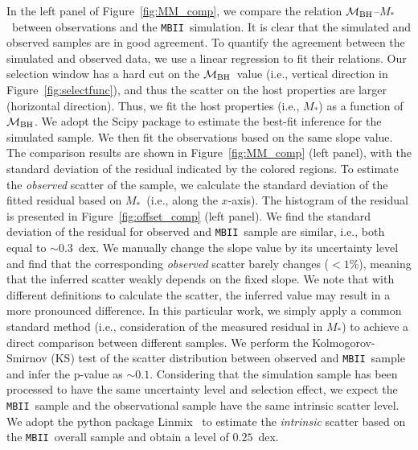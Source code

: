 \documentclass[twocolumn,trackchanges]{aastex63}
\newcommand{\mbh}{$\mathcal M_{\rm BH}$}
\newcommand{\mstar}{{$M_*$}}
\newcommand{\mbii}{\texttt{MBII}}
\begin{document}
In the left panel of Figure~\ref{fig:MM_comp}, we compare the relation \mbh--\mstar~between observations and the \mbii\ simulation. It is clear that the simulated and observed samples are in good agreement. 
To quantify the agreement between the simulated and observed data, we use a linear regression to fit their relations. Our selection window has a hard cut on the \mbh\ value (i.e., vertical direction in Figure~\ref{fig:selectfunc}), and thus the scatter on the host properties are larger (horizontal direction). Thus, we fit the host properties (i.e., \mstar) as a function of \mbh. We adopt the {\sc Scipy} package to estimate the best-fit inference for the simulated sample. We then fit the observations based on the same slope value. The comparison results are shown in Figure~\ref{fig:MM_comp} (left panel), with the standard deviation of the residual indicated by the colored regions.
To estimate the {\it observed} scatter of the sample, we calculate the standard deviation of the fitted residual based on \mstar\ (i.e., along the $x$-axis). The histogram of the residual is presented in Figure~\ref{fig:offset_comp} (left panel). We find the standard deviation of the residual for observed and \mbii\ sample are similar, i.e., both equal to $\sim0.3$~dex. We manually change the slope value by its uncertainty level and find that the corresponding {\it observed} scatter barely changes ($<1\%$), meaning that the inferred scatter weakly depends on the fixed slope. We note that with different definitions to calculate the scatter, the inferred value may result in a more pronounced difference. In this particular work, we simply apply a common standard method (i.e., consideration of the measured residual in \mstar) to achieve a direct comparison between different samples. We perform the Kolmogorov-Smirnov (KS) test of the scatter distribution between observed and \mbii\ sample and infer the p-value as $\sim0.1$. Considering that the simulation sample has been processed to have the same uncertainty level and selection effect, we expect the \mbii\ sample and the observational sample have the same intrinsic scatter level. We adopt the python package {\sc Linmix}~\citep{Kelly2007} to estimate the {\it intrinsic} scatter based on the \mbii\ overall sample and obtain a level of $0.25$~dex.

\end{document}
